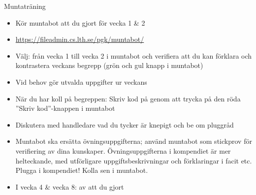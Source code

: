 \begin{SlideExtra}{Muntaträning}
\begin{itemize}\SlideFontSmall
\item Kör muntabot  att du gjort  för vecka 1 \& 2
\item \url{https://fileadmin.cs.lth.se/pgk/muntabot/}
\item Välj: från vecka 1 till vecka 2 i muntabot och verifiera att du kan förklara och kontrastera veckans begrepp (grön och gul knapp i muntabot)
\item Vid behov gör utvalda uppgifter ur veckans   
\item När du har koll på begreppen: Skriv kod  på  genom att trycka på den röda ''Skriv kod''-knappen i muntabot
\item Diskutera med handledare vad du tycker är knepigt och be om pluggråd
\item Muntabot ska  ersätta övningsuppgifterna; använd muntabot som stickprov för verifiering av dina kunskaper. Övningsuppgifterna i kompendiet är mer helteckande, med utförligare uppgiftsbeskrivningar och förklaringar i facit etc. Plugga i kompendiet! Kolla sen i muntabot.
\item I vecka 4 \& vecka 8:  av att du gjort 
\end{itemize}
\end{SlideExtra}

\fi 


